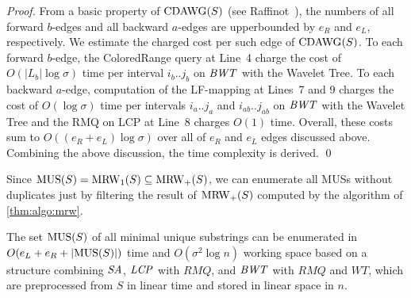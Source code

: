 \begin{proof}
From a basic property of $\mathrm{CDAWG}(S)$ (see Raffinot~\cite{raffinot2001maximal}), the numbers of all forward $b$-edges and all backward $a$-edges are upperbounded by $e_R$ and $e_L$, respectively. We estimate the charged cost per such edge of $\mathrm{CDAWG}(S)$. 
To each forward $b$-edge, the ColoredRange query at Line~4 charge the cost of $O(|L_b| \log\sigma)$ time per interval $i_b..j_b$ on $\mathit{BWT}$ with the Wavelet Tree.
To each backward $a$-edge, computation of the LF-mapping at Lines~7 and 9 charges the cost of $O(\log\sigma)$ time per intervals $i_a..j_a$ and $i_{ab}..j_{ab}$ on $\mathit{BWT}$ with the Wavelet Tree and the RMQ on LCP at Line~8 charges $O(1)$ time.
Overall, these costs sum to $O((e_R + e_L) \log\sigma)$ over all of $e_R$ and $e_L$ edges discussed above. Combining the above discussion, the time complexity is derived. 
\qed 
\end{proof}


  Since $\mathrm{MUS}(S) = \mathrm{MRW}_1(S) \subseteq \mathrm{MRW}_+(S)$, we can enumerate all MUSs without duplicates just by filtering the result of $\mathrm{MRW}_+(S)$ computed by the algorithm of  \cref{thm:algo:mrw}.  

\begin{corollary}\label{thm:algo:mus:ebf}
The set $\mathrm{MUS}(S)$ of all minimal unique substrings can be enumerated in $O(e_L + e_R + |\mathrm{MUS}(S)|)$ time and $O(\sigma^2\log n)$ working space
  based on a structure combining $\mathit{SA}$, $\mathit{LCP}$ with $RMQ$, and $\mathit{BWT}$ with $RMQ$ and $WT$,  which are preprocessed from $S$ in linear time and stored in linear space in $n$. 
\end{corollary}

